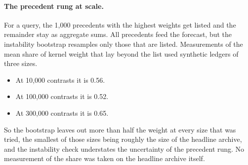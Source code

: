 \paragraph{The precedent rung at scale.}
For a query, the 1,000 precedents with the highest weights get listed and the remainder stay as aggregate sums. All precedents feed the forecast, but the instability bootstrap resamples only those that are listed.
Measurements of the mean share of kernel weight that lay beyond the list used synthetic ledgers of three sizes.
\begin{itemize}
\item At 10,000 contrasts it is 0.56.
\item At 100,000 contrasts it is 0.52.
\item At 300,000 contrasts it is 0.65.
\end{itemize}
So the bootstrap leaves out more than half the weight at every size that was tried, the smallest of those sizes being roughly the size of the headline archive, and the instability check understates the uncertainty of the precedent rung. No measurement of the share was taken on the headline archive itself.

